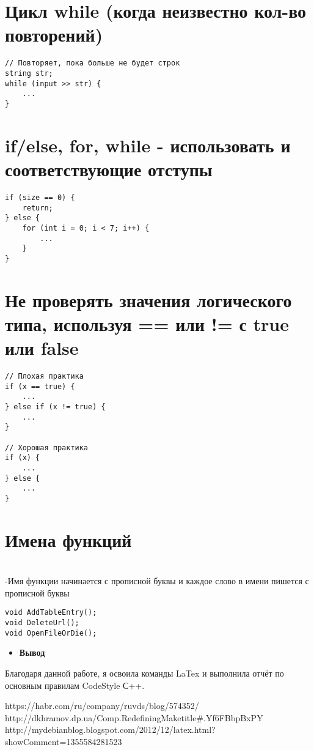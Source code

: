 \documentclass[12pt, letterpaper]{article}
\begin{document}
\section{Цикл while (когда неизвестно кол-во повторений)}
\begin{verbatim}
// Повторяет, пока больше не будет строк
string str;
while (input >> str) {
    ...
}
\end{verbatim}
\vspace*{20mm}
\section{if/else, for, while - использовать {} и соответствующие отступы}
\begin{verbatim}
if (size == 0) {
    return;
} else {
    for (int i = 0; i < 7; i++) {
        ...
    }
}
\end{verbatim}
\section{Не проверять значения логического типа, используя == или != с true или false}
\begin{verbatim}
// Плохая практика
if (x == true) {
    ...
} else if (x != true) {
    ...
}

// Хорошая практика
if (x) {
    ...
} else {
    ...
}
\end{verbatim}
\section{Имена функций}
\\-Имя функции начинается с прописной буквы и каждое слово в имени пишется с прописной буквы
\begin{verbatim}
void AddTableEntry();
void DeleteUrl();
void OpenFileOrDie();
\end{verbatim}
\newpage
\begin{itemize}
\item\Large\textbf{Вывод}
\end{itemize}
Благодаря данной работе, я освоила команды LaTex и выполнила отчёт по основным правилам CodeStyle С++. 
\begin{thebibliography}{3}
     https://habr.com/ru/company/ruvds/blog/574352/
     http://dkhramov.dp.ua/Comp.RedefiningMaketitle#.Yf6FBbpBxPY
     http://mydebianblog.blogspot.com/2012/12/latex.html?showComment=1355584281523
\end{thebibliography}
\end{document}
